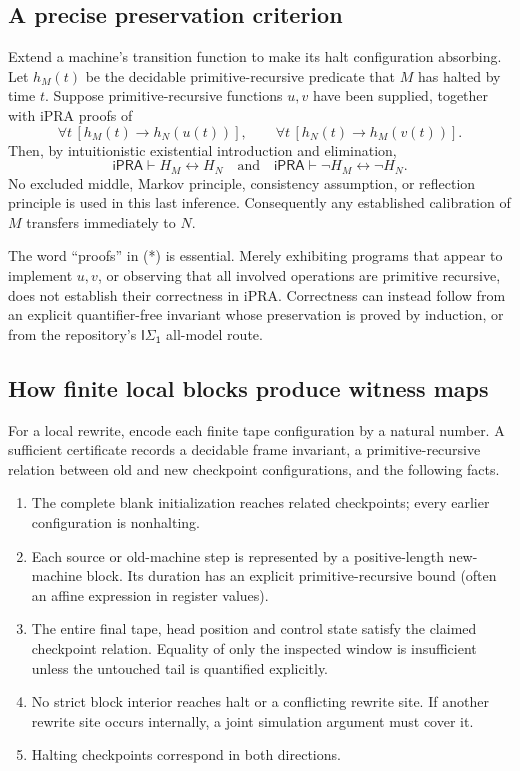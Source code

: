 \subsection{A precise preservation criterion}

Extend a machine's transition function to make its halt configuration
absorbing.  Let $h_M(t)$ be the decidable primitive-recursive predicate
that $M$ has halted by time $t$.  Suppose primitive-recursive functions
$u,v$ have been supplied, together with iPRA proofs of
\[
 \forall t\,[h_M(t)\to h_N(u(t))],\qquad
 \forall t\,[h_N(t)\to h_M(v(t))].                 \tag{*}
\]
Then, by intuitionistic existential introduction and elimination,
\[
 \mathsf{iPRA}\vdash H_M\leftrightarrow H_N
 \quad\text{and}\quad
 \mathsf{iPRA}\vdash\neg H_M\leftrightarrow\neg H_N.
\]
No excluded middle, Markov principle, consistency assumption, or
reflection principle is used in this last inference.  Consequently any
established calibration of $M$ transfers immediately to $N$.

The word ``proofs'' in (*) is essential.  Merely exhibiting programs that
appear to implement $u,v$, or observing that all involved operations are
primitive recursive, does not establish their correctness in iPRA.
Correctness can instead follow from an explicit quantifier-free invariant
whose preservation is proved by induction, or from the repository's
$\mathsf{I\Sigma_1}$ all-model route.

\subsection{How finite local blocks produce witness maps}

For a local rewrite, encode each finite tape configuration by a natural
number.  A sufficient certificate records a decidable frame invariant,
a primitive-recursive relation between old and new checkpoint
configurations, and the following facts.
\begin{enumerate}
\item The complete blank initialization reaches related checkpoints;
      every earlier configuration is nonhalting.
\item Each source or old-machine step is represented by a positive-length
      new-machine block.  Its duration has an explicit primitive-recursive
      bound (often an affine expression in register values).
\item The entire final tape, head position and control state satisfy the
      claimed checkpoint relation.  Equality of only the inspected window
      is insufficient unless the untouched tail is quantified explicitly.
\item No strict block interior reaches halt or a conflicting rewrite site.
      If another rewrite site occurs internally, a joint simulation argument
      must cover it.
\item Halting checkpoints correspond in both directions.
\end{enumerate}

